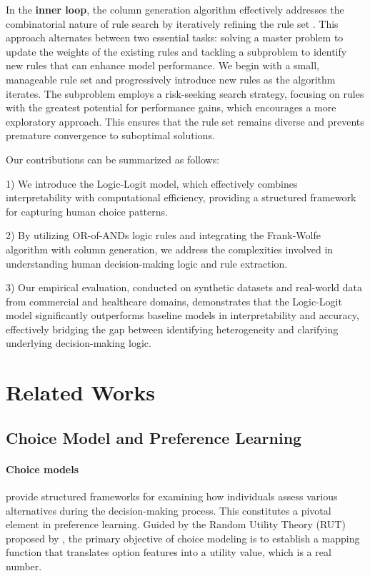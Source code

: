 \documentclass{article} %
\begin{document}
In the {\bf inner loop}, the column generation algorithm effectively addresses the combinatorial nature of rule search by iteratively refining the rule set \citep{wei2019generalized}. This approach alternates between two essential tasks: solving a master problem to update the weights of the existing rules and tackling a subproblem to identify new rules that can enhance model performance. We begin with a small, manageable rule set and progressively introduce new rules as the algorithm iterates. The subproblem employs a risk-seeking search strategy, focusing on rules with the greatest potential for performance gains, which encourages a more exploratory approach. This ensures that the rule set remains diverse and prevents premature convergence to suboptimal solutions.

Our contributions can be summarized as follows:

1) We introduce the Logic-Logit model, which effectively combines interpretability with computational efficiency, providing a structured framework for capturing human choice patterns.

2) By utilizing OR-of-ANDs logic rules and integrating the Frank-Wolfe algorithm with column generation, we address the complexities involved in understanding human decision-making logic and rule extraction.

3) Our empirical evaluation, conducted on synthetic datasets and real-world data from commercial and healthcare domains, demonstrates that the Logic-Logit model significantly outperforms baseline models in interpretability and accuracy, effectively bridging the gap between identifying heterogeneity and clarifying underlying decision-making logic.
\section{Related Works}
\label{gen_inst}
\subsection{Choice Model and Preference Learning}
\paragraph{Choice models} provide structured frameworks for examining how individuals assess various alternatives during the decision-making process. This constitutes a pivotal element in preference learning. Guided by the Random Utility Theory (RUT) proposed by \citet{mcfadden1981econometric}, the primary objective of choice modeling is to establish a mapping function that translates option features into a utility value, which is a real number.
\end{document}
